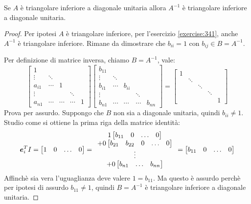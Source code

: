 \begin{exercise}[3.4]
Se $A$ \`e triangolare inferiore a diagonale unitaria allora $A^{-1}$ \`e
triangolare inferiore a diagonale unitaria.
\end{exercise}
\begin{proof}
Per ipotesi $A$ \`e triangolare inferiore, per l'esercizio \ref{exercise:341},
anche $A^{-1}$ \`e triangolare inferiore. Rimane da dimostrare che $b_{ii} = 1$
con $b_{ij} \in B = A^{-1}$.

Per definizione di matrice inversa, chiamo $B = A^{-1}$, vale:
\begin{displaymath}
\begin{bmatrix}
1 \\
\vdots & \ddots \\
a_{i1} & \cdots & 1 \\
\vdots & 		&		& \ddots\\
a_{n1} & \cdots & \cdots &\cdots & 1
\end{bmatrix} %
\begin{bmatrix}
b_{11} \\
\vdots & \ddots \\
b_{i1} & \cdots & b_{ii} \\
\vdots & 		&		& \ddots \\
b_{n1} & \cdots & \cdots &\cdots & b_{nn}
\end{bmatrix} =
\begin{bmatrix}
1 \\
 & \ddots \\
 & 		& \ddots \\
 & 		&		& \ddots\\
 &  	&  		&		& 1
\end{bmatrix}
\end{displaymath}
Prova per assurdo. Suppongo che $B$ non sia a diagonale unitaria, quindi
$b_{ii} \not = 1$.
Studio come si ottiene la prima riga della matrice identit\`a:
\begin{displaymath}
\boldsymbol{e}_{i}^{T} I = 
\begin{bmatrix}
1 & 0 & \ldots & 0
\end{bmatrix} = 
\begin{array}{c}
1
	\begin{bmatrix}
	b_{11} & 0 & \ldots & 0
	\end{bmatrix} \\
+ 0
	\begin{bmatrix}
	b_{21} & b_{22} & 0 & \ldots & 0
	\end{bmatrix}  \\
\vdots \\
+ 0
	\begin{bmatrix}
	b_{n1} & \ldots & b_{nn}
	\end{bmatrix}
\end{array} =
	\begin{bmatrix}
	b_{11} & 0 & \ldots & 0
	\end{bmatrix} 
\end{displaymath}
Affinch\`e sia vera l'uguaglianza deve valere $1 = b_{11}$. Ma questo \`e
assurdo perch\`e per ipotesi di assurdo $b_{11} \not = 1$, quindi $B=A^{-1}$ \`e
triangolare inferiore a diagonale unitaria.
\end{proof}

